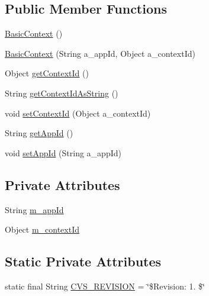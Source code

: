 \subsection*{Public Member Functions}
\begin{DoxyCompactItemize}
\item 
\hyperlink{classorg_1_1jgap_1_1distr_1_1grid_1_1common_1_1_basic_context_a3c07c52953376670681a3c0138d0e790}{Basic\-Context} ()
\item 
\hyperlink{classorg_1_1jgap_1_1distr_1_1grid_1_1common_1_1_basic_context_ab932a4a5473afce70d67c46f72da6793}{Basic\-Context} (String a\-\_\-app\-Id, Object a\-\_\-context\-Id)
\item 
Object \hyperlink{classorg_1_1jgap_1_1distr_1_1grid_1_1common_1_1_basic_context_a4dd90ba262464e28345370bfd321b5f7}{get\-Context\-Id} ()
\item 
String \hyperlink{classorg_1_1jgap_1_1distr_1_1grid_1_1common_1_1_basic_context_a70a8f8afec2fd33ec71e19fc4de6b0d1}{get\-Context\-Id\-As\-String} ()
\item 
void \hyperlink{classorg_1_1jgap_1_1distr_1_1grid_1_1common_1_1_basic_context_aa43cb563a9525d72e7066494e3fcd024}{set\-Context\-Id} (Object a\-\_\-context\-Id)
\item 
String \hyperlink{classorg_1_1jgap_1_1distr_1_1grid_1_1common_1_1_basic_context_a013e844ec406d6d7d595172793ba090c}{get\-App\-Id} ()
\item 
void \hyperlink{classorg_1_1jgap_1_1distr_1_1grid_1_1common_1_1_basic_context_a69eecaad49ba228b6495c92a276122d5}{set\-App\-Id} (String a\-\_\-app\-Id)
\end{DoxyCompactItemize}
\subsection*{Private Attributes}
\begin{DoxyCompactItemize}
\item 
String \hyperlink{classorg_1_1jgap_1_1distr_1_1grid_1_1common_1_1_basic_context_afc60459b792c5b97dded9b688dfe5ed0}{m\-\_\-app\-Id}
\item 
Object \hyperlink{classorg_1_1jgap_1_1distr_1_1grid_1_1common_1_1_basic_context_a4405e07a69a3fc4ce5c8614f275e5df8}{m\-\_\-context\-Id}
\end{DoxyCompactItemize}
\subsection*{Static Private Attributes}
\begin{DoxyCompactItemize}
\item 
static final String \hyperlink{classorg_1_1jgap_1_1distr_1_1grid_1_1common_1_1_basic_context_ad0efe7cb452822b126d6d19649d009e2}{C\-V\-S\-\_\-\-R\-E\-V\-I\-S\-I\-O\-N} = \char`\"{}\$Revision\-: 1. \$\char`\"{}
\end{DoxyCompactItemize}


